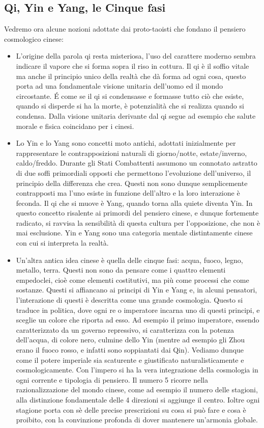\documentclass[10pt,a4paper]{report}
\begin{document}
\subsection{Qi, Yin e Yang, le Cinque fasi}
Vedremo ora alcune nozioni adottate dai proto-taoisti che fondano il pensiero cosmologico cinese:
\begin{itemize}
	\item L'origine della parola qi resta misteriosa, l'uso del carattere moderno sembra indicare il vapore che si forma sopra il riso in cottura. Il qi è il soffio vitale ma anche il principio unico della realtà che dà forma ad ogni cosa, questo porta ad una fondamentale visione unitaria dell'uomo ed il mondo circostante. \'E come se il qi si condensasse e formasse tutto ciò che esiste, quando si disperde si ha la morte, è potenzialità che si realizza quando si condensa. Dalla visione unitaria derivante dal qi segue ad esempio che salute morale e fisica coincidano per i cinesi.
	\item Lo Yin e lo Yang sono concetti moto antichi, adottati inizialmente per rappresentare le contrapposizioni naturali di giorno/notte, estate/inverno, caldo/freddo. Durante gli Stati Combattenti assumono un connotato astratto di due soffi primordiali opposti che permettono l'evoluzione dell'universo, il principio della differenza che crea. Questi non sono dunque semplicemente contrapposti ma l'uno esiste in funzione dell'altro e la loro interazione è feconda. Il qi che si muove è Yang, quando torna alla quiete diventa Yin. In questo concetto risalente ai primordi del pensiero cinese, e dunque fortemente radicato, si ravvisa la sensibilità di questa cultura per l'opposizione, che non è mai esclusione. Yin e Yang sono una categoria mentale distintamente cinese con cui si interpreta la realtà.
	\item Un'altra antica idea cinese è quella delle cinque fasi: acqua, fuoco, legno, metallo, terra. Questi non sono da pensare come i quattro elementi empedoclei, cioè come elementi costitutivi, ma più come processi che come sostanze. Questi si affiancano ai principi di Yin e Yang e, in alcuni pensatori, l'interazione di questi è descritta come una grande cosmologia. Questo si traduce in politica, dove ogni re o imperatore incarna uno di questi principi, e sceglie un colore che riporta ad esso. Ad esempio il primo imperatore, essendo caratterizzato da un governo repressivo, si caratterizza con la potenza dell'acqua, di colore nero, culmine dello Yin (mentre ad esempio gli Zhou erano il fuoco rosso, e infatti sono soppiantati dai Qin). Vediamo dunque come il potere imperiale sia scaturente e giustificato naturalisticamente e cosmologicamente. Con l'impero si ha la vera integrazione della cosmologia in ogni corrente e tipologia di pensiero. Il numero 5 ricorre nella razionalizzazione del mondo cinese, come ad esempio il numero delle stagioni, alla distinzione fondamentale delle 4 direzioni si aggiunge il centro. Ioltre ogni stagione porta con sè delle precise prescrizioni su cosa si può fare e cosa è proibito, con la convinzione profonda di dover mantenere un'armonia globale. 
\end{itemize}
\end{document}
